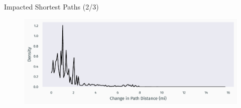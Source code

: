 \documentclass{beamer}
\numberwithin{figure}{section} %
\numberwithin{table}{section} %
\begin{document}
\begin{frame}{Impacted Shortest Paths (2/3)}
    \begin{figure}
        \centering
        \includegraphics[width=\textwidth]{graphs/path_dists.pdf}
    \end{figure}
\end{frame}
\end{document}
